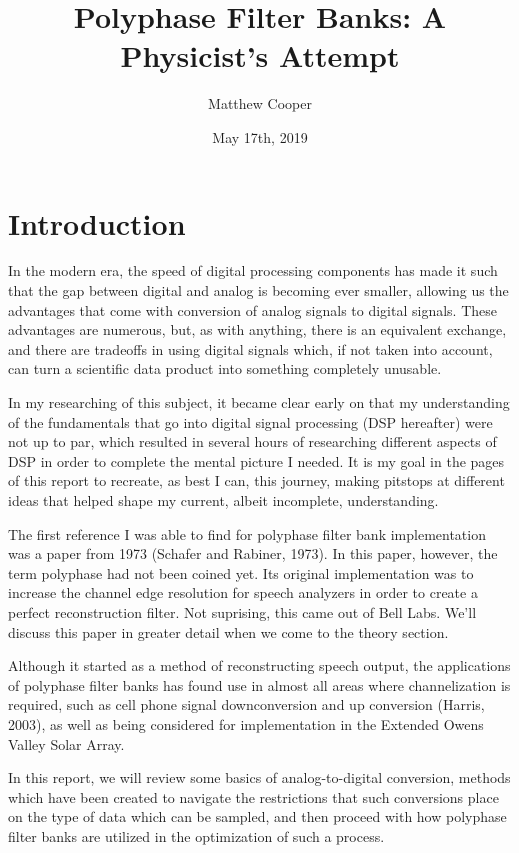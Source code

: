 \documentclass{report}
\title{Polyphase Filter Banks: A Physicist's Attempt}
\author{Matthew Cooper}
\date{May 17th, 2019}
\begin{document}
\maketitle

\tableofcontents{}

\newpage
\chapter{Introduction}

In the modern era, the speed of digital processing components has made it such that the gap between digital and analog is becoming ever smaller, allowing us the advantages that come with conversion of analog signals to digital signals.  These advantages are numerous, but, as with anything, there is an equivalent exchange, and there are tradeoffs in using digital signals which, if not taken into account, can turn a scientific data product into something completely unusable.

In my researching of this subject, it became clear early on that my understanding of the fundamentals that go into digital signal processing (DSP hereafter) were not up to par, which resulted in several hours of researching different aspects of DSP in order to complete the mental picture I needed.  It is my goal in the pages of this report to recreate, as best I can, this journey, making pitstops at different ideas that helped shape my current, albeit incomplete, understanding.  

The first reference I was able to find for polyphase filter bank implementation was a paper from 1973 (Schafer and Rabiner, 1973).  In this paper, however, the term polyphase had not been coined yet.  Its original implementation was to increase the channel edge resolution for speech analyzers in order to create a perfect reconstruction filter.  Not suprising, this came out of Bell Labs.  We'll discuss this paper in greater detail when we come to the theory section.

Although it started as a method of reconstructing speech output, the applications of polyphase filter banks has found use in almost all areas where channelization is required, such as cell phone signal downconversion and up conversion (Harris, 2003), as well as being considered for implementation in the Extended Owens Valley Solar Array.  

In this report, we will review some basics of analog-to-digital conversion, methods which have been created to navigate the restrictions that such conversions place on the type of data which can be sampled, and then proceed with how polyphase filter banks are utilized in the optimization of such a process.  
\end{document}

